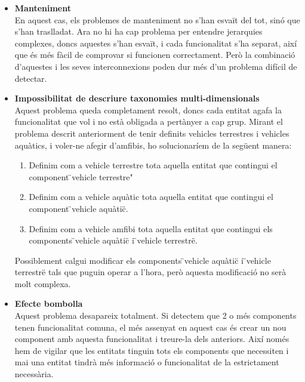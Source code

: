 \begin{itemize}
  \item {\bf Manteniment} \hfill \\
    En aquest cas, els problemes de manteniment no s'han esvaït del tot, sinó que s'han traslladat. Ara no hi ha cap problema per entendre jerarquies complexes, doncs aquestes s'han esvaït, i cada funcionalitat s'ha separat, així que és més fàcil de comprovar si funcionen correctament. Però la combinació d'aquestes i les seves interconnexions poden dur més d'un problema difícil de detectar.
    
  \item {\bf Impossibilitat de descriure taxonomies multi-dimensionals} \hfill \\
    Aquest problema queda completament resolt, doncs cada entitat agafa la funcionalitat que vol i no està obligada a pertànyer a cap grup. Mirant el problema descrit anteriorment de tenir definits vehicles terrestres i vehicles aquàtics, i voler-ne afegir d'amfibis, ho solucionaríem de la següent manera:
    \begin{enumerate}
      \item Definim com a vehicle terrestre tota aquella entitat que contingui el component \"{}vehicle terrestre"
      \item Definim com a vehicle aquàtic tota aquella entitat que contingui el component \"{}vehicle aquàtic\"{}.
      \item Definim com a vehicle amfibi tota aquella entitat que contingui els components \"{}vehicle aquàtic\"{} i  \"{}vehicle terrestre\"{}.
    \end{enumerate}
    
    Possiblement calgui modificar els components \"{}vehicle aquàtic\"{} i  \"{}vehicle terrestre\"{} tals que puguin operar a l'hora, però aquesta modificació no serà molt complexa.
    
  \item {\bf Efecte bombolla} \hfill \\
    Aquest problema desapareix totalment. Si detectem que 2 o més components tenen funcionalitat comuna, el més assenyat en aquest cas és crear un nou component amb aquesta funcionalitat i treure-la dels anteriors. Així només hem de vigilar que les entitats tinguin tots els components que necessiten i mai una entitat tindrà més informació o funcionalitat de la estrictament necessària.
    
\end{itemize}

